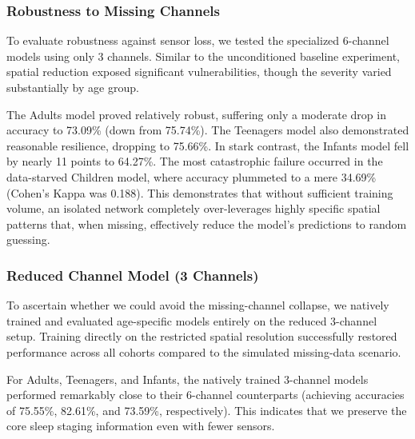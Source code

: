 \subsubsection*{Robustness to Missing Channels}
To evaluate robustness against sensor loss, we tested the specialized 6-channel models using only 3 channels. Similar to the unconditioned baseline experiment, spatial reduction exposed significant vulnerabilities, though the severity varied substantially by age group. 

The Adults model proved relatively robust, suffering only a moderate drop in accuracy to 73.09\% (down from 75.74\%). The Teenagers model also demonstrated reasonable resilience, dropping to 75.66\%. In stark contrast, the Infants model fell by nearly 11 points to 64.27\%. The most catastrophic failure occurred in the data-starved Children model, where accuracy plummeted to a mere 34.69\% (Cohen's Kappa was 0.188). This demonstrates that without sufficient training volume, an isolated network completely over-leverages highly specific spatial patterns that, when missing, effectively reduce the model's predictions to random guessing.

\subsubsection*{Reduced Channel Model (3 Channels)}
To ascertain whether we could avoid the missing-channel collapse, we natively trained and evaluated age-specific models entirely on the reduced 3-channel setup. Training directly on the restricted spatial resolution successfully restored performance across all cohorts compared to the simulated missing-data scenario.

For Adults, Teenagers, and Infants, the natively trained 3-channel models performed remarkably close to their 6-channel counterparts (achieving accuracies of 75.55\%, 82.61\%, and 73.59\%, respectively). This indicates that we preserve the core sleep staging information even with fewer sensors. 

